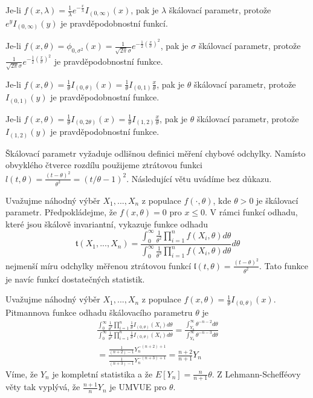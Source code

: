 \begin{example}
Je-li $f(x, \lambda) = \frac{1}{\lambda}e^{-\frac{x}{\lambda}}I_{(0, \infty)}(x)$, pak je $\lambda$ škálovací parametr, protože $e^{y}I_{(0, \infty)}(y)$ je pravděpodobnostní funkcí.

Je-li $f(x, \theta) = \phi_{0, \sigma^2}(x) = \frac{1}{\sqrt{2 \pi} \sigma}e^{-\frac{1}{2}\left(\frac{x}{\sigma}\right)^2}$, pak je $\sigma$ škálovací parametr, protože $\frac{1}{\sqrt{2 \pi}\sigma}e^{-\frac{1}{2}\left(\frac{x}{\sigma}\right)^2}$ je pravděpodobnostní funkce.

Je-li $f(x, \theta) = \frac{1}{\theta}I_{(0, \theta)}(x) = \frac{1}{\theta}I_{(0, 1)}\frac{x}{\theta}$, pak je $\theta$ škálovací parametr, protože $I_{(0,1)}(y)$ je pravděpodobnostní funkce.

Je-li $f(x, \theta) = \frac{1}{\theta}I_{(0, 2 \theta)}(x) = \frac{1}{\theta}I_{(1,2)}\frac{x}{\theta}$, pak je $\theta$ škálovací parametr, protože $I_{(1,2)}(y)$ je pravděpodobnostní funkce.
\end{example}

Škálovací parametr vyžaduje odlišnou definici měření chybové odchylky. Namísto obvyklého čtverce rozdílu použijeme ztrátovou funkci $l(t, \theta) = \frac{(t - \theta)^2}{\theta^2} = (t/\theta - 1)^2$. Následující větu uvádíme bez důkazu.

\begin{theorem}
Uvažujme náhodný výběr $X_1, ..., X_n$ z populace $f(\cdot, \theta)$, kde $\theta > 0$ je škálovací parametr. Předpokládejme, že $f(x, \theta) = 0$ pro $x \le 0$. V rámci funkcí odhadu, které jsou škálově invariantní, vykazuje funkce odhadu
\begin{equation*}
\mathfrak{t}(X_1, ..., X_n) = \frac{\int_0^{\infty}\frac{1}{\theta^2}\prod_{i = 1}^n f(X_i, \theta)d \theta}{\int_0^{\infty} \frac{1}{\theta^3}\prod_{i = 1}^nf(X_i, \theta) d \theta} d \theta
\end{equation*}
nejmenší míru odchylky měřenou ztrátovou funkcí $\mathfrak{l}(t, \theta) = \frac{(t - \theta)^2}{\theta^2}$. Tato funkce je navíc funkcí dostatečných statistik.
\end{theorem}

\begin{example}
Uvažujme náhodný výběr $X_1, ..., X_n$ z populace $f(x, \theta) = \frac{1}{\theta}I_{(0, \theta)}(x)$. Pitmannova funkce odhadu škálovacího parametru $\theta$ je
\begin{gather*}
\frac{\int_0^{\infty}\frac{1}{\theta^2}\prod_{i = 1}^n\frac{1}{\theta}I_{(0, \theta)}(X_i)d \theta}{\int_0^{\infty}\frac{1}{\theta^3}\prod_{i = 1}^n\frac{1}{\theta}I_{(0, \theta)}(X_i)d \theta} = \frac{\int_{Y_n}^{\infty}\theta^{-n - 2}d \theta}{\int_{Y_n}^{\infty}\theta^{-n - 3}d \theta}\\
= \frac{\frac{1}{(n + 2) - 1}Y_n^{-(n + 2) + 1}}{\frac{1}{(n + 3) - 1}Y_n^{-(n + 3) + 1}} = \frac{n + 2}{n + 1}Y_n
\end{gather*}
Víme, že $Y_n$ je kompletní statistika a že $E[Y_n] = \frac{n}{n + 1}\theta$. Z Lehmann-Schefféovy věty tak vyplývá, že $\frac{n + 1}{n}Y_n$ je UMVUE pro $\theta$.
\end{example}

